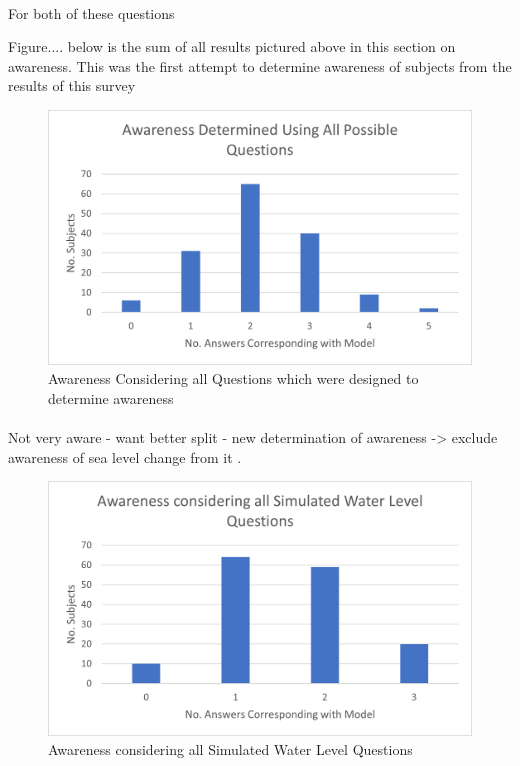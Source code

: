 \paragraph{}

For both of these questions 

Figure.... below is the sum of all results pictured above in this section on awareness. This was the first attempt to determine awareness of subjects from the results of this survey

\begin{figure}[h]
    \centering
    \includegraphics{fig_results/aware_all.png}
    \caption{Awareness Considering all Questions which were designed to determine awareness}
    \label{fig:aware-all}
\end{figure}
\paragraph{}

Not very aware - want better split - new determination of awareness -> exclude awareness of sea level change from it .

\begin{figure}[h]
    \centering
    \includegraphics{fig_results/Awareness_ all_simulation_pictures_qs.png}
    \caption{Awareness considering all Simulated Water Level Questions}
    \label{fig:my_label}
\end{figure}

